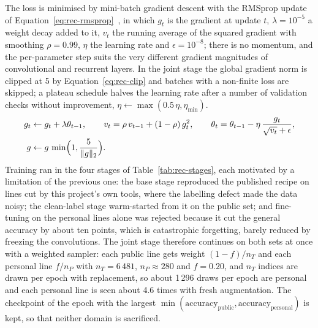 The loss is minimised by mini-batch gradient descent with the RMSprop update of Equation~\ref{eq:rec-rmsprop}~\cite{tieleman2012}, in which $g_t$ is the gradient at update $t$, $\lambda=10^{-5}$ a weight decay added to it, $v_t$ the running average of the squared gradient with smoothing $\rho=0.99$, $\eta$ the learning rate and $\epsilon=10^{-8}$; there is no momentum, and the per-parameter step suits the very different gradient magnitudes of convolutional and recurrent layers.
In the joint stage the global gradient norm is clipped at 5 by Equation~\ref{eq:rec-clip} and batches with a non-finite loss are skipped; a plateau schedule halves the learning rate after a number of validation checks without improvement, $\eta\leftarrow\max(0.5\,\eta,\eta_{\min})$.
\begin{align}
g_t&\leftarrow g_t+\lambda\theta_{t-1},\qquad v_t=\rho\,v_{t-1}+(1-\rho)\,g_t^2,\qquad \theta_t=\theta_{t-1}-\eta\,\frac{g_t}{\sqrt{v_t}+\epsilon},\label{eq:rec-rmsprop}\\
g&\leftarrow g\,\min\Bigl(1,\frac{5}{\|g\|_2}\Bigr).\label{eq:rec-clip}
\end{align}
Training ran in the four stages of Table~\ref{tab:rec-stages}, each motivated by a limitation of the previous one: the base stage reproduced the published recipe on lines cut by this project's own tools, where the labelling defect made the data noisy; the clean-label stage warm-started from it on the public set; and fine-tuning on the personal lines alone was rejected because it cut the general accuracy by about ten points, which is catastrophic forgetting, barely reduced by freezing the convolutions.
The joint stage therefore continues on both sets at once with a weighted sampler: each public line gets weight $(1-f)/n_T$ and each personal line $f/n_P$ with $n_T=6\,481$, $n_P\approx280$ and $f=0.20$, and $n_T$ indices are drawn per epoch with replacement, so about 1\,296 draws per epoch are personal and each personal line is seen about 4.6 times with fresh augmentation.
The checkpoint of the epoch with the largest $\min(\text{accuracy}_{\mathrm{public}},\text{accuracy}_{\mathrm{personal}})$ is kept, so that neither domain is sacrificed.

